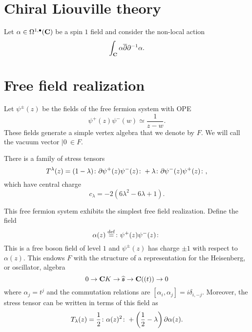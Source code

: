 \documentclass[11pt]{amsart}
\begin{document}


\section{Chiral Liouville theory}

Let $\alpha \in \Omega^{1,\bullet}(\mathbf{C})$ be a spin $1$ field and consider the non-local action
\begin{equation}
\int_{\mathbf{C}} \alpha \overline{\partial} \partial^{-1} \alpha .
\end{equation}

\section{Free field realization}

Let $\psi^\pm(z)$ be the fields of the free fermion system with OPE
\begin{equation}
\psi^+(z) \psi^-(w) \simeq \frac{1}{z-w} .
\end{equation}
These fields generate a simple vertex algebra that we denote by $F$.
We will call the vacuum vector $|0\> \in F$.

There is a family of stress tensors
\begin{equation}
T^\lambda (z) = (1-\lambda) \colon \partial \psi^+(z) \psi^- (z) \colon  + \lambda \colon \partial \psi^- (z)\psi^+(z) \colon ,
\end{equation}
which have central charge
\begin{equation}
c_\lambda = - 2 (6 \lambda^2 - 6 \lambda + 1) .
\end{equation}

This free fermion system exhibits the simplest free field realization.
Define the field
\begin{equation}
\alpha(z) \overset{\rm def}{=} \colon \psi^+(z) \psi^-(z) \colon 
\end{equation}
This is a free boson field of level $1$ and $\psi^\pm(z)$ has charge $\pm 1$ with respect to $\alpha(z)$.
This endows $F$ with the structure of a representation for the Heisenberg, or oscillator, algebra
\begin{equation}
0 \to \mathbf{C} K \to \widehat{\mathfrak{s}} \to \mathbf{C}((t)) \to 0
\end{equation}
where $\alpha_j = t^j$ and the commutation relations are $[\alpha_i, \alpha_j] = i \delta_{i,-j}$.
Moreover, the stress tensor can be written in terms of this field as
\begin{equation}
T_\lambda(z) = \frac12 \colon \alpha(z)^2 \colon + \left(\frac12 - \lambda\right) \partial \alpha (z) .
\end{equation}
\end{document}
